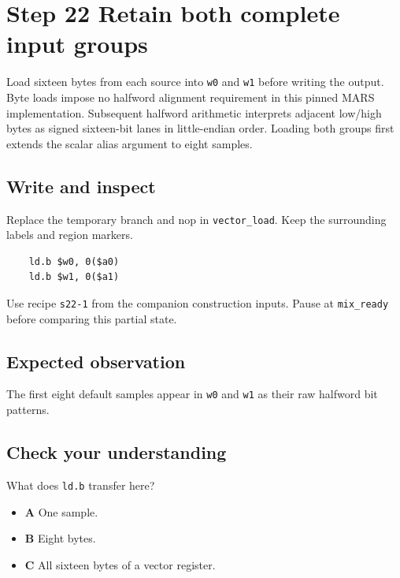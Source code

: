 \section{Step 22 Retain both complete input groups}\label{pcm-s22}

Load sixteen bytes from each source into \texttt{w0} and \texttt{w1} before writing the output. Byte loads impose no halfword alignment requirement in this pinned MARS implementation. Subsequent halfword arithmetic interprets adjacent low/high bytes as signed sixteen-bit lanes in little-endian order. Loading both groups first extends the scalar alias argument to eight samples.

\subsection{Write and inspect}
Replace the temporary branch and nop in \texttt{vector\_load}. Keep the surrounding labels and region markers.

\begin{verbatim}
    ld.b $w0, 0($a0)
    ld.b $w1, 0($a1)
\end{verbatim}
Use recipe \texttt{s22-1} from the companion construction inputs. Pause at \texttt{mix\_ready} before comparing this partial state.

\subsection{Expected observation}
The first eight default samples appear in \texttt{w0} and \texttt{w1} as their raw halfword bit patterns.

\subsection{Check your understanding}
What does \texttt{ld.b} transfer here?

\begin{itemize}
\item \textbf{A} One sample.
\item \textbf{B} Eight bytes.
\item \textbf{C} All sixteen bytes of a vector register.
\end{itemize}
